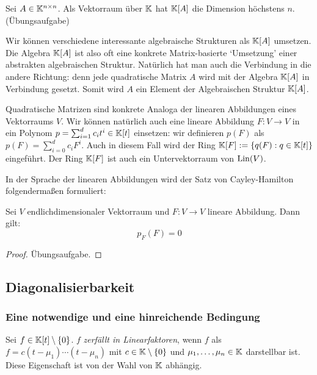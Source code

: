 \begin{bem}
	Sei $ A \in \mathbb K^{n \times n} $. Als Vektorraum über $ \mathbb K $ hat $ \mathbb K[A] $ die Dimension höchstens $ n $. (Übungsaufgabe)
\end{bem}

\begin{bem}
	Wir können verschiedene interessante algebraische Strukturen als $\mathbb K[A]$ umsetzen. Die Algebra $\mathbb K[A]$ ist also oft eine konkrete Matrix-basierte `Umsetzung' einer abstrakten algebraischen Struktur. Natürlich hat man auch die Verbindung in die andere Richtung: denn jede quadratische Matrix $A$ wird mit  der Algebra $\mathbb K[A]$ in Verbindung gesetzt.  Somit wird $A$ ein Element der Algebraischen Struktur $\mathbb K[A]$. 
\end{bem}

Quadratische Matrizen sind konkrete Analoga der linearen Abbildungen eines Vektorraums $V$. Wir können natürlich auch eine lineare Abbildung $F : V \to V$ in ein Polynom 
$ p = \sum_{i=1}^{d} c_it^i \in \mathbb K[t] $ einsetzen: wir definieren $p(F)$ als $ p(F) = \sum_{i=0}^{d} c_iF^i $. Auch in diesem Fall wird der Ring $ \mathbb K[F] := \left\{ q(F) : q \in \mathbb K[t] \right\} $ eingeführt. Der Ring $\mathbb K[F]$ ist auch ein Untervektorraum von $\operatorname{Lin}(V)$. 

In der Sprache der linearen Abbildungen wird der Satz von Cayley-Hamilton folgendermaßen formuliert: 

\begin{thm}
	Sei $ V $ endlichdimensionaler Vektorraum und $ F : V \to V $ lineare Abbildung. Dann gilt:
	\begin{equation}
		p_F(F) = 0
	\end{equation}
\end{thm}
\begin{proof}
	Übungsaufgabe.
\end{proof}

\clearpage
\subsection{Diagonalisierbarkeit}

\subsubsection{Eine notwendige und eine hinreichende Bedingung}

Sei $ f \in \mathbb K[t] \setminus \left\{ 0 \right\} $. $ f $ \emph{zerfällt in Linearfaktoren}, wenn $ f $ als $ f = c(t-\mu_1) \cdots (t-\mu_n) $ mit $ c \in \mathbb K \setminus \left\{ 0 \right\} $ und $ \mu_1, \ldots, \mu_n \in \mathbb K $ darstellbar ist. Diese Eigenschaft ist von der Wahl von $ \mathbb K $ abhängig.

